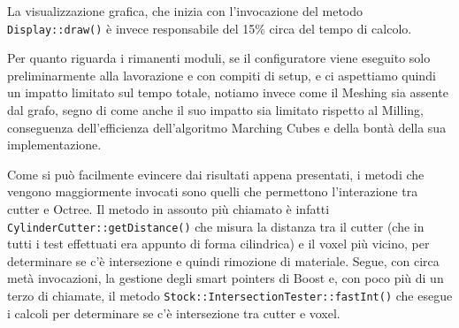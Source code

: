 La visualizzazione grafica, che inizia con l'invocazione del metodo \texttt{Display::draw()} è invece responsabile del 15\% circa del tempo di calcolo.

Per quanto riguarda i rimanenti moduli, se il configuratore viene eseguito solo preliminarmente alla lavorazione e con compiti di setup, e ci aspettiamo quindi un impatto limitato sul tempo totale, notiamo invece come il Meshing sia assente dal grafo, segno di come anche il suo impatto sia limitato rispetto al Milling, conseguenza dell'efficienza dell'algoritmo Marching Cubes e della bontà della sua implementazione.

Come si può facilmente evincere dai risultati appena presentati, i metodi che vengono maggiormente invocati sono quelli che permettono l'interazione tra cutter e Octree. Il metodo in assouto più chiamato è infatti \texttt{CylinderCutter::getDistance()} che misura la distanza tra il cutter (che in tutti i test effettuati era appunto di forma cilindrica) e il voxel più vicino, per determinare se c'è intersezione e quindi rimozione di materiale. Segue, con circa metà invocazioni, la gestione degli smart pointers di Boost e, con poco più di un terzo di chiamate, il metodo \texttt{Stock::IntersectionTester::fastInt()} che esegue i calcoli per determinare se c'è intersezione tra cutter e voxel.
